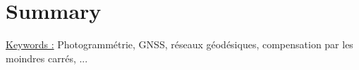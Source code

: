 
\chapter*{Summary}
\thispagestyle{empty}
\lipsum[1-4]

\vspace{1cm}
\underline{Keywords :} Photogrammétrie, GNSS, réseaux géodésiques, compensation par les moindres carrés, ...